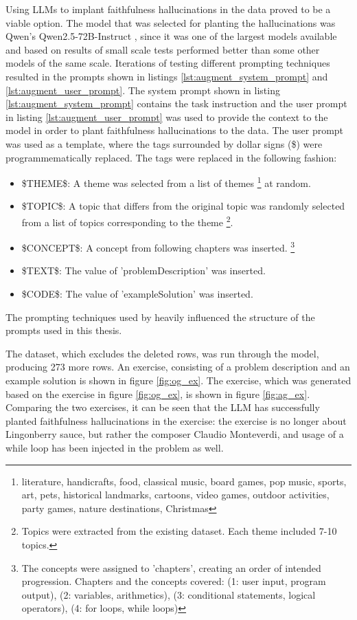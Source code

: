 \documentclass[english, 12pt, a4paper, sci, utf8, a-2b, online]{../definitions/aaltothesis}
\begin{document}
Using LLMs to implant faithfulness hallucinations in the data proved to be a viable option. The model that was selected for planting the hallucinations was Qwen's Qwen2.5-72B-Instruct \cite{yang2024qwen2technicalreport}, since it was one of the largest models available and based on results of small scale tests performed better than some other models of the same scale. Iterations of testing different prompting techniques resulted in the prompts shown in listings \ref{lst:augment_system_prompt} and \ref{lst:augment_user_prompt}. The system prompt shown in listing \ref{lst:augment_system_prompt} contains the task instruction and the user prompt in listing \ref{lst:augment_user_prompt} was used to provide the context to the model in order to plant faithfulness hallucinations to the data. The user prompt was used as a template, where the tags surrounded by dollar signs (\$) were programmematically replaced. The tags were replaced in the following fashion:
\begin{itemize}
    \item \$THEME\$: A theme was selected from a list of themes \footnote{literature, handicrafts, food, classical music, board games, pop music, sports, art, pets, historical landmarks, cartoons, video games, outdoor activities, party games, nature destinations, Christmas} at random.
    \item \$TOPIC\$: A topic that differs from the original topic was randomly selected from a list of topics corresponding to the theme \footnote{Topics were extracted from the existing dataset. Each theme included 7-10 topics.}.
    \item \$CONCEPT\$: A concept from following chapters was inserted. \footnote{The concepts were assigned to 'chapters', creating an order of intended progression. Chapters and the concepts covered: (1: user input, program output), (2: variables, arithmetics), (3: conditional statements, logical operators), (4: for loops, while loops)}
    \item \$TEXT\$: The value of 'problemDescription' was inserted.
    \item \$CODE\$: The value of 'exampleSolution' was inserted.
\end{itemize}
The prompting techniques used by \textcite{ming2025faithevallanguagemodelstay} heavily influenced the structure of the prompts used in this thesis.

The dataset, which excludes the deleted rows, was run through the model, producing 273 more rows. An exercise, consisting of a problem description and an example solution is shown in figure \ref{fig:og_ex}. The exercise, which was generated based on the exercise in figure \ref{fig:og_ex}, is shown in figure \ref{fig:ag_ex}. Comparing the two exercises, it can be seen that the LLM has successfully planted faithfulness hallucinations in the exercise: the exercise is no longer about Lingonberry sauce, but rather the composer Claudio Monteverdi, and usage of a while loop has been injected in the problem as well.    
\end{document}
